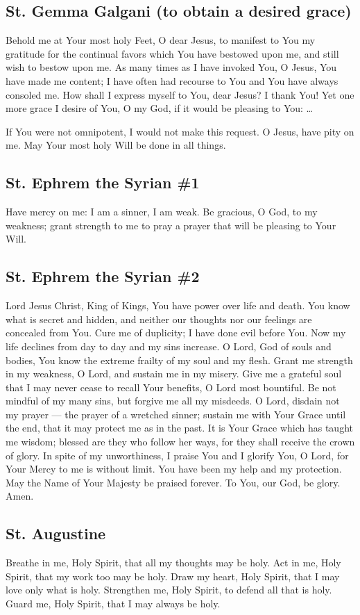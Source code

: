 \documentclass[12pt]{article}
\newcommand{\prayertitle}[1]{\subsection{#1}}
\begin{document}
\prayertitle{St. Gemma Galgani (to obtain a desired grace)}
Behold me at Your most holy Feet, O dear Jesus, to manifest to You my gratitude for the continual favors which You have bestowed upon me, and still wish to bestow upon me.
As many times as I have invoked You, O Jesus, You have made me content;
I have often had recourse to You and You have always consoled me.
How shall I express myself to You, dear Jesus?
I thank You!
Yet one more grace I desire of You, O my God, if it would be pleasing to You: \ldots


If You were not omnipotent, I would not make this request.
O Jesus, have pity on me.
May Your most holy Will be done in all things.

\prayertitle{St. Ephrem the Syrian \#1}
Have mercy on me:
I am a sinner, I am weak.
Be gracious, O God, to my weakness;
grant strength to me to pray a prayer that will be pleasing to Your Will.

\prayertitle{St. Ephrem the Syrian \#2}
\label{prayer:StEphrem2}
Lord Jesus Christ, King of Kings, You have power over life and death.
You know what is secret and hidden, and neither our thoughts nor our feelings are concealed from You.
Cure me of duplicity;
I have done evil before You.
Now my life declines from day to day and my sins increase.
O Lord, God of souls and bodies, You know the extreme frailty of
my soul and my flesh.
Grant me strength in my weakness, O Lord, and sustain me in my misery.
Give me a grateful soul that I may never cease to recall Your benefits, O Lord most bountiful.
Be not mindful of my many sins, but forgive me all my misdeeds.
O Lord, disdain not my prayer --- the prayer of a wretched sinner;
sustain me with Your Grace until the end, that it may protect me as in the past.
It is Your Grace which has taught me wisdom;
blessed are they who follow her ways, for they shall receive the crown of glory.
In spite of my unworthiness, I praise You and I glorify You, O Lord, for Your Mercy to me is without limit.
You have been my help and my protection.
May the Name of Your Majesty be praised forever. 
To You, our God, be glory.
Amen.

\prayertitle{St. Augustine}
Breathe in me, Holy Spirit, that all my thoughts may be holy.
Act in me, Holy Spirit, that my work too may be holy.
Draw my heart, Holy Spirit, that I may love only what is holy.
Strengthen me, Holy Spirit, to defend all that is holy.
Guard me, Holy Spirit, that I may always be holy.
\end{document}
